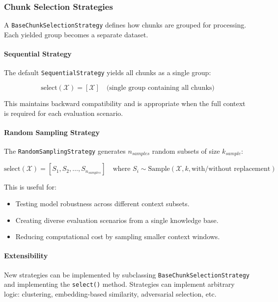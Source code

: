 \documentclass[11pt,a4paper]{article}
\begin{document}
\subsubsection{Chunk Selection Strategies}

A \texttt{BaseChunkSelectionStrategy} defines how chunks are grouped for processing. Each yielded group becomes a separate dataset.

\paragraph{Sequential Strategy}

The default \texttt{SequentialStrategy} yields all chunks as a single group:

$$\text{select}(\mathcal{X}) = [\mathcal{X}] \quad \text{(single group containing all chunks)}$$

This maintains backward compatibility and is appropriate when the full context is required for each evaluation scenario.

\paragraph{Random Sampling Strategy}

The \texttt{RandomSamplingStrategy} generates $n_{samples}$ random subsets of size $k_{sample}$:

$$\text{select}(\mathcal{X}) = [S_1, S_2, \ldots, S_{n_{samples}}] \quad \text{where } S_i \sim \text{Sample}(\mathcal{X}, k, \text{with/without replacement})$$

This is useful for:

\begin{itemize}
    \item Testing model robustness across different context subsets.
    \item Creating diverse evaluation scenarios from a single knowledge base.
    \item Reducing computational cost by sampling smaller context windows.
\end{itemize}

\paragraph{Extensibility}

New strategies can be implemented by subclassing \texttt{BaseChunkSelectionStrategy} and implementing the \texttt{select()} method. Strategies can implement arbitrary logic: clustering, embedding-based similarity, adversarial selection, etc.
\end{document}
